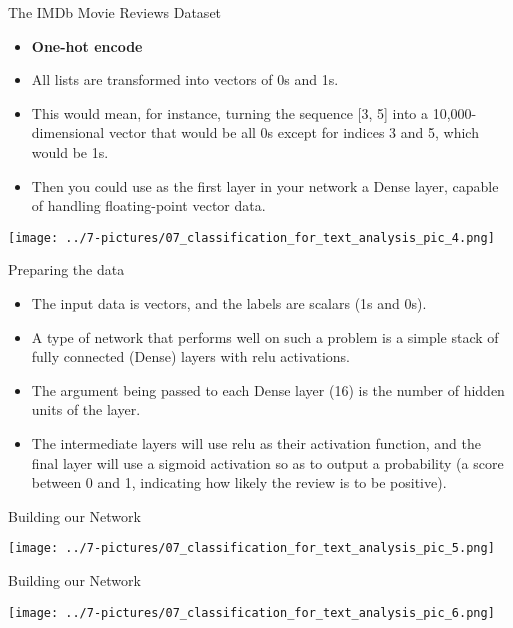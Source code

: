 \documentclass[11pt]{beamer}
\begin{document}
\begin{frame}{The IMDb Movie Reviews Dataset}
	\begin{itemize}
		\item \textbf{One-hot encode}
		\item All lists are transformed into vectors of 0s and 1s. 
		\item This would mean, for instance, turning the sequence [3, 5] into a 10,000-dimensional vector that would be all 0s except for indices 3 and 5, which would be 1s. 
		\item Then you could use as the first layer in your network a Dense layer, capable of handling floating-point vector data.
	\end{itemize}
	\begin{center}
	\texttt{[image: ../7-pictures/07\_classification\_for\_text\_analysis\_pic\_4.png]}
	\end{center}
\end{frame}
\begin{frame}{Preparing the data}
	\begin{itemize}
		\item The input data is vectors, and the labels are scalars (1s and 0s). 
		\item A type of network that performs well on such a problem is a simple stack of fully connected (Dense) layers with relu activations.
		\item The argument being passed to each Dense layer (16) is the number of hidden units of the layer.
		\item The intermediate layers will use relu as their activation function, and the final layer will use a sigmoid activation so as to output a probability (a score between 0 and 1, indicating how likely the review is to be positive). 
	\end{itemize}
\end{frame}
\begin{frame}{Building our Network}
	\begin{center}
	\texttt{[image: ../7-pictures/07\_classification\_for\_text\_analysis\_pic\_5.png]}
	\end{center}
\end{frame}
\begin{frame}{Building our Network}
	\begin{center}
	\texttt{[image: ../7-pictures/07\_classification\_for\_text\_analysis\_pic\_6.png]}
	\end{center}
\end{frame}
\end{document}
